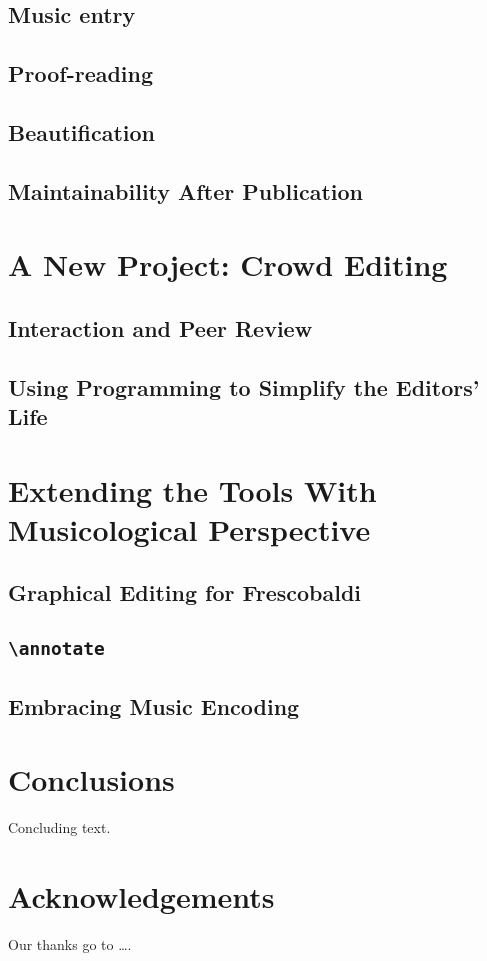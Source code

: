 \documentclass[11pt,a4paper]{article}
\begin{document}
\subsection{Music entry}

\subsection{Proof-reading}

\subsection{Beautification}

\subsection{Maintainability After Publication}


\section{A New Project: Crowd Editing}

\subsection{Interaction and Peer Review}

\subsection{Using Programming to Simplify the Editors' Life}


\section{Extending the Tools With Musicological Perspective}

\subsection{Graphical Editing for Frescobaldi}

\subsection{\texttt{\textbackslash annotate}}

\subsection{Embracing Music Encoding}


\section{Conclusions}

Concluding text.

\section{Acknowledgements}

Our thanks go to \ldots .
\end{document}
